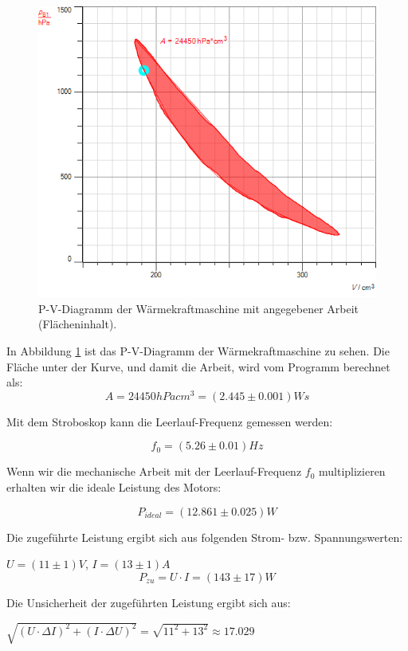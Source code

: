 \documentclass[12pt,a4paper,twopage]{article}
\begin{document}
\begin{center}
\begin{figure}[H]
\includegraphics[scale=0.7]{bachgraf/heissluft.png}
\caption{P-V-Diagramm der Wärmekraftmaschine mit angegebener Arbeit (Flächeninhalt).}
\label{fig:heissluft-pv}
\end{figure}
\end{center}

In Abbildung \ref{fig:heissluft-pv} ist das P-V-Diagramm der Wärmekraftmaschine zu sehen. Die Fläche unter der Kurve, und damit die Arbeit, wird vom Programm berechnet als:
$$A=24450hPa cm^3 =(2.445 \pm 0.001) Ws$$

Mit dem Stroboskop kann die Leerlauf-Frequenz gemessen werden:

$$f_0=(5.26 \pm 0.01)Hz$$

Wenn wir die mechanische Arbeit mit der Leerlauf-Frequenz $f_0$ multiplizieren erhalten wir die ideale Leistung des Motors:

$$\boxed{P_{ideal}=(12.861 \pm 0.025)W}$$

Die zugeführte Leistung ergibt sich aus folgenden Strom- bzw. Spannungswerten: 

$U=(11 \pm 1)V$, $I=(13 \pm 1)A$
$$\boxed{P_{zu}=U \cdot I = (143 \pm 17)W}$$

Die Unsicherheit der zugeführten Leistung ergibt sich aus:

$\sqrt{(U\cdot\Delta I)^2+(I\cdot\Delta U)^2}=\sqrt{11^2+13^2}\approx17.029$
\end{document}
